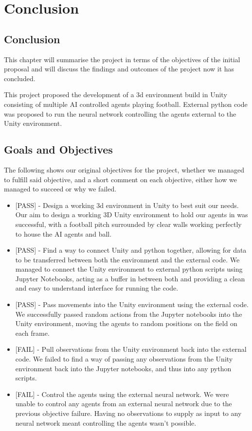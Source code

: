 
\chapter{Conclusion}

\section{Conclusion}
This chapter will summarise the project in terms of the objectives of the initial proposal and will discuss the findings and outcomes of the project now it has concluded.

This project proposed the development of a 3d environment build in Unity consisting of multiple AI controlled agents playing football. External python code was proposed to run the neural network controlling the agents external to the Unity environment. 

\section{Goals and Objectives}

The following shows our original objectives for the project, whether we managed to fulfill said objective, and a short comment on each objective, either how we managed to succeed or why we failed.

\begin{itemize}
    \item{[PASS] - Design a working 3d environment in Unity to best suit our needs.
Our aim to design a working 3D Unity environment to hold our agents in was successful, with a football pitch surrounded by clear walls working perfectly to house the AI agents and ball.}

    \item{[PASS] - Find a way to connect Unity and python together, allowing for data to be transferred between both the environment and the external code.
We managed to connect the Unity environment to external python scripts using Jupyter Notebooks, acting as a buffer in between both and providing a clean and easy to understand interface for running the code.}

    \item{[PASS] - Pass movements into the Unity environment using the external code.
We successfully passed random actions from the Jupyter notebooks into the Unity environment, moving the agents to random positions on the field on each frame.}

    \item{[FAIL] - Pull observations from the Unity environment back into the external code.
We failed to find a way of passing any observations from the Unity environment back into the Jupyter notebooks, and thus into any python scripts.}

    \item{[FAIL] - Control the agents using the external neural network.
We were unable to control any agents from an external neural network due to the previous objective failure. Having no observations to supply as input to any neural network meant controlling the agents wasn't possible.}
\end{itemize}

